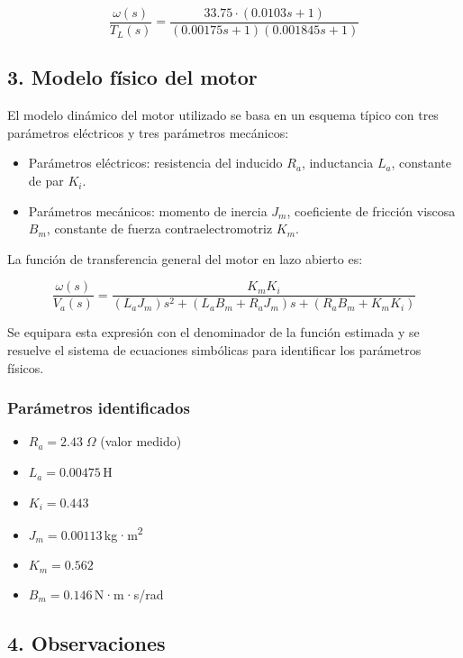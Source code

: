\documentclass{article}
\begin{document}
\[
\frac{\omega(s)}{T_L(s)} = \frac{33.75 \cdot (0.0103s + 1)}{(0.00175s + 1)(0.001845s + 1)}
\]

\subsection{3. Modelo físico del motor}

El modelo dinámico del motor utilizado se basa en un esquema típico con tres parámetros eléctricos y tres parámetros mecánicos:

\begin{itemize}
    \item Parámetros eléctricos: resistencia del inducido $R_a$, inductancia $L_a$, constante de par $K_i$.
    \item Parámetros mecánicos: momento de inercia $J_m$, coeficiente de fricción viscosa $B_m$, constante de fuerza contraelectromotriz $K_m$.
\end{itemize}

La función de transferencia general del motor en lazo abierto es:

\[
\frac{\omega(s)}{V_a(s)} = \frac{K_m K_i}{(L_a J_m) s^2 + (L_a B_m + R_a J_m) s + (R_a B_m + K_m K_i)}
\]

Se equipara esta expresión con el denominador de la función estimada y se resuelve el sistema de ecuaciones simbólicas para identificar los parámetros físicos.

\subsubsection*{Parámetros identificados}

\begin{itemize}
    \item $R_a = 2.43\;\Omega$ (valor medido)
    \item $L_a = 0.00475$\,H
    \item $K_i = 0.443$
    \item $J_m = 0.00113$\,kg·m\textsuperscript{2}
    \item $K_m = 0.562$
    \item $B_m = 0.146$\,N·m·s/rad
\end{itemize}

\subsection{4. Observaciones}
\end{document}
